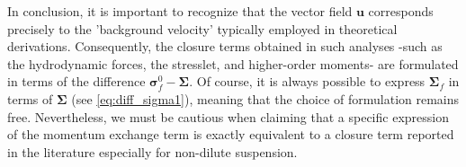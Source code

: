 In conclusion, it is important to recognize that the vector field \(\textbf{u}\) corresponds precisely to the 'background velocity' typically employed in theoretical derivations. 
Consequently, the closure terms obtained in such analyses -such as the hydrodynamic forces, the stresslet, and higher-order moments- are formulated in terms of the difference \(\bm\sigma_f^0 - \bm\Sigma\).
Of course, it is always possible to express \(\bm\Sigma_f\) in terms of \(\bm\Sigma\) (see \ref{eq:diff_sigma1}), meaning that the choice of formulation remains free. 
Nevertheless, we must be cautious when claiming that a specific expression of the momentum exchange term is exactly equivalent to a closure term reported in the literature especially for non-dilute suspension. 

